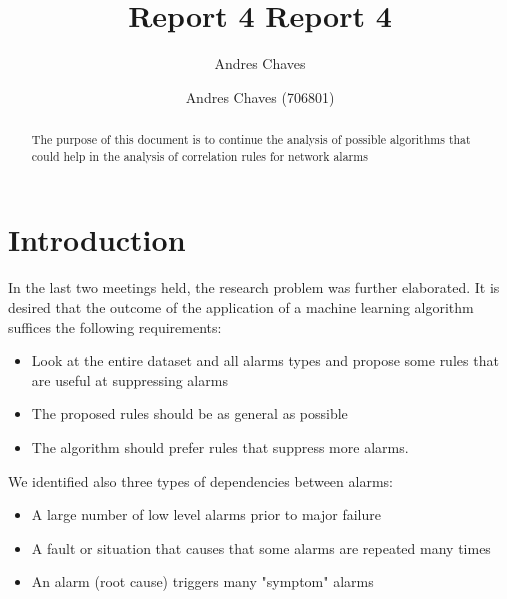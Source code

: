 \documentclass[10pt,a4paper]{article}
\author{Andres Chaves}
\title{Report 4 }
\begin{document}
 \title{Report 4}
 \author{Andres Chaves (706801) \\
  }
 \maketitle
 
  \begin{abstract}
    The purpose of this document is to continue the analysis of possible algorithms that could help in the analysis of correlation rules for network alarms
\end{abstract}

 \section*{Introduction}
In the last two meetings held, the research problem was further elaborated. It is desired that the outcome of the application of a machine learning algorithm suffices the following requirements:

\begin{itemize}
\item Look at the entire dataset and all alarms types and propose some rules that are useful at suppressing alarms
\item The proposed rules should be as general as possible
\item The algorithm should prefer rules that suppress more alarms.
\end{itemize}

We identified also three types of dependencies between alarms:
\begin{itemize}
\item A large number of low level alarms prior to major failure
\item A fault or situation that causes that some alarms are repeated many times
\item An alarm (root cause) triggers many "symptom" alarms
\end{itemize}
\end{document}
